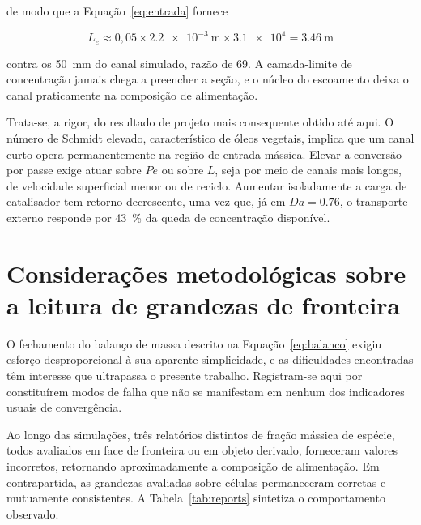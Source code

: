 \noindent
de modo que a Equação~\eqref{eq:entrada} fornece

\begin{equation}
L_e \approx 0{,}05 \times \SI{2.2e-3}{\meter} \times \num{3.1e4} = \SI{3.46}{\meter}
\end{equation}

\noindent
contra os \SI{50}{\milli\meter} do canal simulado, razão de \num{69}. A
camada-limite de concentração jamais chega a preencher a seção, e o núcleo do
escoamento deixa o canal praticamente na composição de alimentação.

Trata-se, a rigor, do resultado de projeto mais consequente obtido até aqui. O
número de Schmidt elevado, característico de óleos vegetais, implica que um
canal curto opera permanentemente na região de entrada mássica. Elevar a
conversão por passe exige atuar sobre $Pe$ ou sobre $L$, seja por meio de canais
mais longos, de velocidade superficial menor ou de reciclo. Aumentar
isoladamente a carga de catalisador tem retorno decrescente, uma vez que, já em
$Da = \num{0.76}$, o transporte externo responde por \SI{43}{\percent} da queda
de concentração disponível.

\section{Considerações metodológicas sobre a leitura de grandezas de fronteira}
\label{sec:reports}

O fechamento do balanço de massa descrito na Equação~\eqref{eq:balanco} exigiu
esforço desproporcional à sua aparente simplicidade, e as dificuldades
encontradas têm interesse que ultrapassa o presente trabalho. Registram-se aqui
por constituírem modos de falha que não se manifestam em nenhum dos indicadores
usuais de convergência.

Ao longo das simulações, três relatórios distintos de fração mássica de espécie,
todos avaliados em face de fronteira ou em objeto derivado, forneceram valores
incorretos, retornando aproximadamente a composição de alimentação. Em
contrapartida, as grandezas avaliadas sobre células permaneceram corretas e
mutuamente consistentes. A Tabela~\ref{tab:reports} sintetiza o comportamento
observado.

